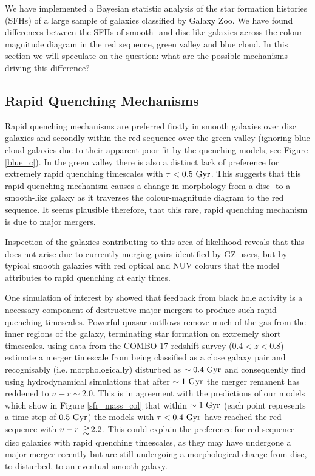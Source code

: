 \documentclass[useAMS,usenatbib]{mn2e}
\def\changed    {\color{titlecol} }
\begin{document}
We have implemented a Bayesian statistic analysis of the star formation histories (SFHs) of a large sample of galaxies classified by Galaxy Zoo. We have found differences between the SFHs of smooth- and disc-like galaxies across the colour-magnitude diagram in the red sequence, green valley and blue cloud. In this section we will speculate on the question: what are the possible mechanisms driving this difference? 

\subsection{Rapid Quenching Mechanisms}\label{rapid}

{\changed Rapid quenching mechanisms are preferred firstly in smooth galaxies over disc galaxies and secondly within the red sequence over the green valley (ignoring blue cloud galaxies due to their apparent poor fit by the quenching models, see Figure \ref{blue_c}). In the green valley there is also a distinct lack of preference for extremely rapid quenching timescales with $\tau < 0.5~\rm{Gyr}$.} This suggests that this rapid quenching mechanism causes a change in morphology from a disc- to a smooth-like galaxy as it traverses the colour-magnitude diagram to the red sequence. It seems plausible therefore, that this rare, rapid quenching mechanism is due to major mergers.


Inspection of the galaxies contributing to this area of likelihood reveals that this does not arise due to \underline{currently} merging pairs identified by GZ users, but by typical smooth galaxies with red optical and NUV colours that the model attributes to rapid quenching at early times.

One simulation of interest by \citet{Springel05} showed that feedback from black hole activity is a necessary component of destructive major mergers to produce such rapid quenching timescales. Powerful quasar outflows remove much of the gas from the inner regions of the galaxy, terminating star formation on extremely short timescales. \citet{Bell06} using data from the COMBO-17 redshift survey ($0.4 < z < 0.8$) estimate a merger timescale from being classified as a close galaxy pair and recognisably (i.e. morphologically) disturbed as $\sim 0.4~\rm{Gyr}$ and \citet{Springel05} consequently find using hydrodynamical simulations that after $\sim1~\rm{Gyr}$ the merger remanent has reddened to $u-r \sim 2.0$. This is in agreement with the predictions of our models which show in Figure \ref{sfr_mass_col} that within $\sim1~\rm{Gyr}$ (each point represents a time step of $0.5~\rm{Gyr}$) the models with $\tau < 0.4~\rm{Gyr}$ have reached the red sequence with $u-r ~\ga 2.2$. {\changed This could explain the preference for red sequence disc galaxies with rapid quenching timescales, as they may have undergone a major merger recently but are still undergoing a morphological change from disc, to disturbed, to an eventual smooth galaxy.} 
\end{document}
